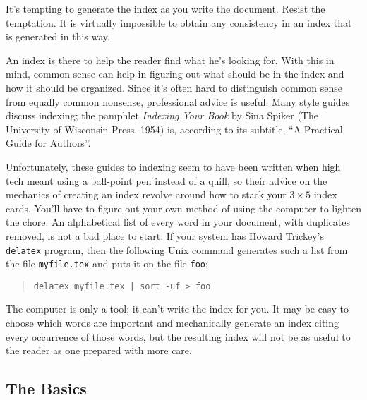 It's tempting to generate the index as you write the document.  Resist
the temptation.  It is virtually impossible to obtain any consistency
in an index that is  generated in this way.
 
An index is there to help the reader find what he's looking for.  With
this in mind, common sense can help in figuring out what should be in
the index and how it should be organized.  Since it's often hard to
distinguish common sense from equally common nonsense, professional
advice is useful.  Many style guides discuss indexing; the pamphlet
{\em Indexing Your Book\/} by Sina Spiker (The University of Wisconsin
Press, 1954) is, according to its subtitle, ``A Practical
Guide for Authors''.
 
Unfortunately, these guides to indexing seem to have been written when
high tech meant using a ball-point pen instead of a quill, so their
advice on the mechanics of creating an index revolve around how to
stack your $3\times 5$ index cards.  You'll have to figure out your own
method of using the computer to lighten the chore.  An alphabetical
list of every word in your document, with duplicates removed, is not a
bad place to start.  If your system has Howard Trickey's {\tt delatex}
program, then the following Unix command generates such a list from the
file {\tt myfile.tex} and puts it on the file {\tt foo}:
\begin{quote}
\tt delatex myfile.tex | sort -uf > foo
\end{quote}
 
The computer is only a tool; it can't write the index for you.  It may
be easy to choose which words are important and mechanically generate
an index citing every occurrence of those words, but the resulting
index will not be as useful to the reader as one prepared with more
care.
 
 
 
 
\subsection{The Basics}
 
